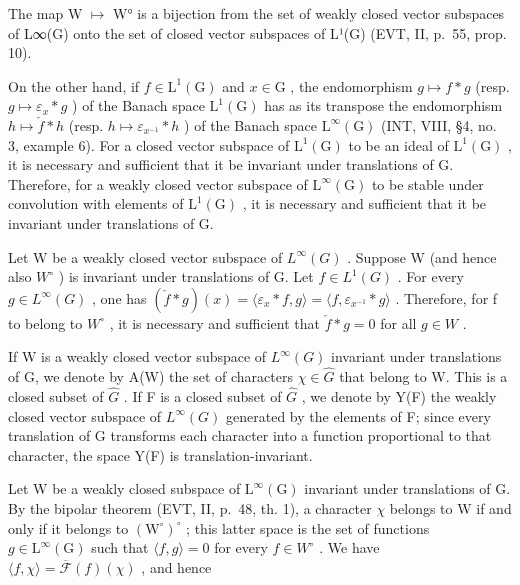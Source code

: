 The map W \(\mapsto\) W° is a bijection from the set of weakly closed vector subspaces of L∞(G) onto the set of closed vector subspaces of L¹(G) (EVT, II, p.~55, prop. 10).

On the other hand, if \(f \in \mathrm{L}^1(\mathrm{G})\) and \(x \in \mathrm{G}\) , the endomorphism \(g \mapsto f * g\) (resp. \(g \mapsto \varepsilon_x * g\) ) of the Banach space \(\mathrm{L}^1(\mathrm{G})\) has as its transpose the endomorphism \(h \mapsto \check{f} * h\) (resp. \(h \mapsto \varepsilon_{x^{-1}} * h\) ) of the Banach space \(\mathrm{L}^\infty(\mathrm{G})\) (INT, VIII, §4, no. 3, example 6). For a closed vector subspace of \(\mathrm{L}^1(\mathrm{G})\) to be an ideal of \(\mathrm{L}^1(\mathrm{G})\) , it is necessary and sufficient that it be invariant under translations of G. Therefore, for a weakly closed vector subspace of \(\mathrm{L}^\infty(\mathrm{G})\) to be stable under convolution with elements of \(\mathrm{L}^1(\mathrm{G})\) , it is necessary and sufficient that it be invariant under translations of G.

Let W be a weakly closed vector subspace of \(L^{\infty}(G)\) . Suppose W (and hence also \(W^{\circ}\) ) is invariant under translations of G. Let \(f \in L^{1}(G)\) . For every \(g \in L^{\infty}(G)\) , one has \((\check{f} * g)(x) = \langle \varepsilon_{x} * f, g \rangle = \langle f, \varepsilon_{x^{-1}} * g \rangle\) . Therefore, for f to belong to \(W^{\circ}\) , it is necessary and sufficient that \(\check{f} * g = 0\) for all \(g \in W\) .

If W is a weakly closed vector subspace of \(L^{\infty}(G)\) invariant under translations of G, we denote by A(W) the set of characters \(\chi \in \widehat{G}\) that belong to W. This is a closed subset of \(\widehat{G}\) . If F is a closed subset of \(\widehat{G}\) , we denote by Y(F) the weakly closed vector subspace of \(L^{\infty}(G)\) generated by the elements of F; since every translation of G transforms each character into a function proportional to that character, the space Y(F) is translation-invariant.

Let W be a weakly closed subspace of \(\mathrm{L}^{\infty}(\mathrm{G})\) invariant under translations of G. By the bipolar theorem (EVT, II, p.~48, th. 1), a character \(\chi\) belongs to W if and only if it belongs to \((\mathrm{W}^{\circ})^{\circ}\) ; this latter space is the set of functions \(g \in \mathrm{L}^{\infty}(\mathrm{G})\) such that \(\langle f, g \rangle = 0\) for every \(f \in W^{\circ}\) . We have \(\langle f, \chi \rangle = \overline{\mathcal{F}}(f)(\chi)\) , and hence

